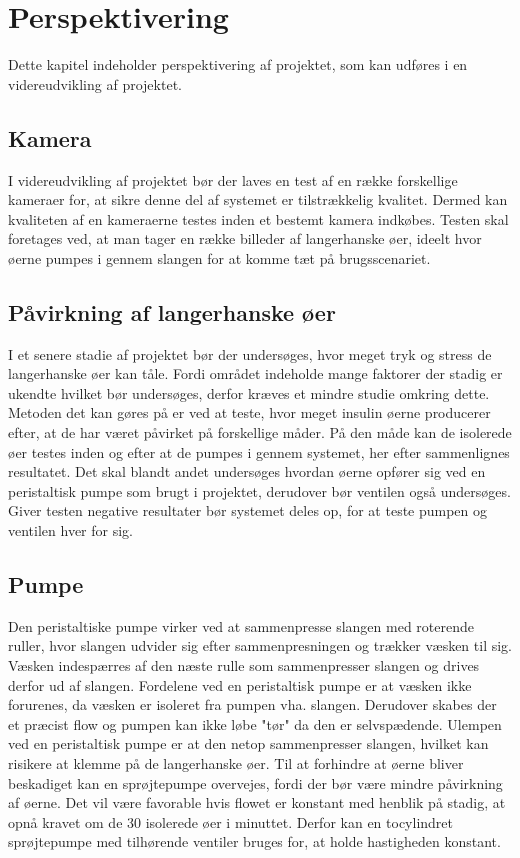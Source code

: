 \chapter{Perspektivering}
Dette kapitel indeholder perspektivering af projektet, som kan udføres i en videreudvikling af projektet.
\section{Kamera}
 I videreudvikling af projektet bør der laves en test af en række forskellige kameraer for, at sikre denne del af systemet er tilstrækkelig kvalitet. Dermed kan kvaliteten af en kameraerne testes inden et bestemt kamera indkøbes. Testen skal foretages ved, at man tager en række billeder af langerhanske øer, ideelt hvor øerne pumpes i gennem slangen for at komme tæt på brugsscenariet. 

\section{Påvirkning af langerhanske øer}
I et senere stadie af projektet bør der undersøges, hvor meget tryk og stress de langerhanske øer kan tåle. Fordi området indeholde mange faktorer der stadig er ukendte hvilket bør undersøges, derfor kræves et mindre studie omkring dette. Metoden det kan gøres på er ved at teste, hvor meget insulin øerne producerer efter, at de har været påvirket på forskellige måder. På den måde kan de isolerede øer testes inden og efter at de pumpes i gennem systemet, her efter sammenlignes resultatet. Det skal blandt andet undersøges hvordan øerne opfører sig ved en peristaltisk pumpe som brugt i projektet, derudover bør ventilen også undersøges. Giver testen negative resultater bør systemet deles op, for at teste pumpen og ventilen hver for sig.

\section{Pumpe}
Den peristaltiske pumpe virker ved at sammenpresse slangen med roterende ruller, hvor slangen udvider sig efter sammenpresningen og trækker væsken til sig. Væsken indespærres af den næste rulle som sammenpresser slangen og drives derfor ud af slangen. Fordelene ved en peristaltisk pumpe er at væsken ikke forurenes, da væsken er isoleret fra pumpen vha. slangen. Derudover skabes der et præcist flow og pumpen kan ikke løbe "tør" da den er selvspædende. Ulempen ved en peristaltisk pumpe er at den netop sammenpresser slangen, hvilket kan risikere at klemme på de langerhanske øer. Til at forhindre at øerne bliver beskadiget kan en sprøjtepumpe overvejes, fordi der bør være mindre påvirkning af øerne. Det vil være favorable hvis flowet er konstant med henblik på stadig, at opnå kravet om de 30 isolerede øer i minuttet. Derfor kan en tocylindret sprøjtepumpe med tilhørende ventiler bruges for, at holde hastigheden konstant. 

